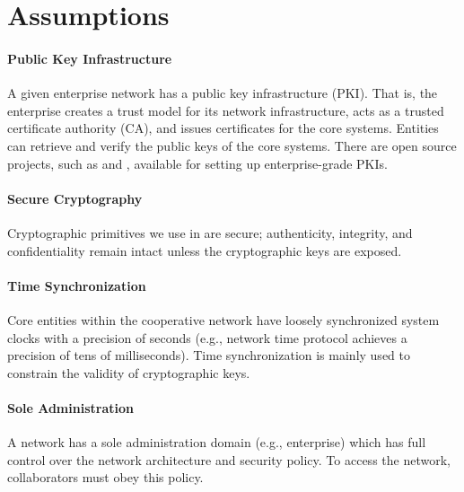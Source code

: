 

\section{Assumptions}
\label{sec:assumptions}

\paragraph{Public Key Infrastructure}
A given enterprise network has a public key infrastructure (PKI). That is, the
enterprise creates a trust model for its network infrastructure, acts as a
trusted certificate authority (CA), and issues certificates for the core
systems. Entities can retrieve and verify the public keys of the core systems.
There are open source projects, such as
 and
, available for setting
up enterprise-grade PKIs.

\paragraph{Secure Cryptography}
Cryptographic primitives we use in \name are secure; authenticity, integrity, and
confidentiality remain intact unless the cryptographic keys are exposed.

\paragraph{Time Synchronization}
Core entities within the cooperative network have loosely synchronized system clocks with a
precision of seconds (e.g., network time protocol achieves a precision of tens of milliseconds).
Time synchronization is mainly used to constrain the validity of cryptographic keys.

\paragraph{Sole Administration}
A network has a sole administration domain (e.g., enterprise) which has full control over
the network architecture and security policy. To access the network, collaborators
must obey this policy.
